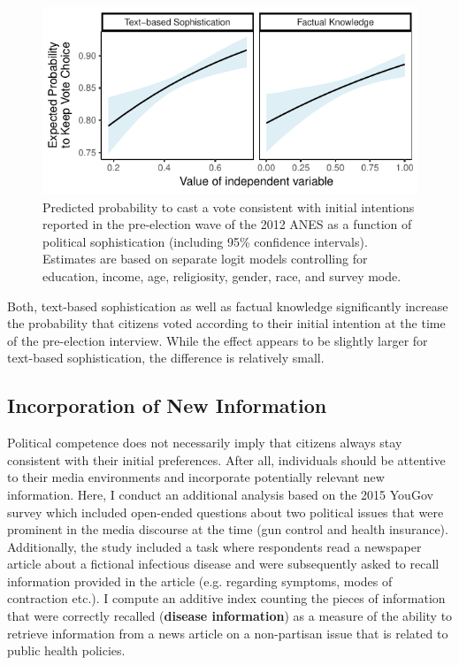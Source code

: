 \documentclass[12pt]{article}
\begin{document}
\begin{figure}[h]\centering
\includegraphics{../fig/prepost_exp.pdf}
\caption{Predicted probability to cast a vote consistent with initial intentions reported in the pre-election wave of the 2012 ANES as a function of political sophistication (including 95\% confidence intervals). Estimates are based on separate logit models controlling for education, income, age, religiosity, gender, race, and survey mode.}\label{fig:prepost}
\end{figure}

Both, text-based sophistication as well as factual knowledge significantly increase the probability that citizens voted according to their initial intention at the time of the pre-election interview. While the effect appears to be slightly larger for text-based sophistication, the difference is relatively small.


\subsection*{Incorporation of New Information}

Political competence does not necessarily imply that citizens always stay consistent with their initial preferences. After all, individuals should be attentive to their media environments and incorporate potentially relevant new information. Here, I conduct an additional analysis based on the 2015 YouGov survey which included open-ended questions about two political issues that were prominent in the media discourse at the time (gun control and health insurance). Additionally, the study included a task where respondents read a newspaper article about a fictional infectious disease and were subsequently asked to recall information provided in the article (e.g. regarding symptoms, modes of contraction etc.). I compute an additive index counting the pieces of information that were correctly recalled (\textbf{disease information}) as a measure of the ability to retrieve information from a news article on a non-partisan issue that is related to public health policies. 
\end{document}
